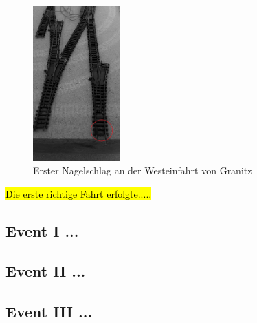 \begin{figure}[h]
\centering
  \includegraphics[width=0.3\textwidth]{img/events/first_nail_edit.png}
	\caption{Erster Nagelschlag an der Westeinfahrt von Granitz}
	\label{img:events_first_nail}
\end{figure}

\clearpage

\hl{Die erste richtige Fahrt erfolgte.....}



\subsection{Event I ...}

\subsection{Event II ...}

\subsection{Event III ...}